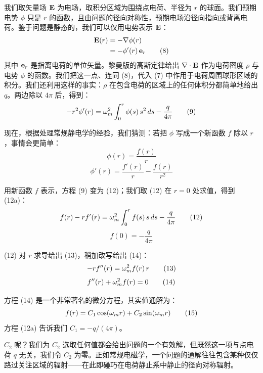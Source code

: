 我们取矢量场 $\mathbf{E}$ 为电场，取积分区域为围绕点电荷、半径为 $r$ 的球面。我们预期电势 $\phi$ 只是 $r$ 的函数，且由问题的径向对称性，预期电场沿径向指向或背离电荷。鉴于问题是静态的，我们可以仅用电势表示 $\mathbf{E}$：
\begin{align}
\mathbf{E}(r) &= -\nabla\phi(r) \nonumber\\
&= -\phi'(r)\,\mathbf{e}_{r} \tag{8}
\end{align}
其中 $\mathbf{e}_{r}$ 是指离电荷的单位矢量。黎曼版的高斯定律给出 $\nabla\cdot\mathbf{E}$ 作为电荷密度 $\rho$ 与电势 $\phi$ 的函数。我们把这一点、连同 (8)，代入 (7) 中作用于电荷周围球形区域的积分。我们还利用这样的事实：$\rho$ 在包含电荷的区域上的任何体积分都简单地给出 $q$。两边除以 $4\pi$ 后，得到：
\begin{equation}
-r^{2}\phi'(r) = \omega_m^{2}\int_{0}^{r}\phi(s)\,s^{2}\,ds - \frac{q}{4\pi} \tag{9}
\end{equation}

现在，根据处理常规静电学的经验，我们猜测：若把 $\phi$ 写成一个新函数 $f$ 除以 $r$，事情会更简单：
\begin{equation}
\phi(r) = \frac{f(r)}{r} \tag{10}
\end{equation}
\begin{equation}
\phi'(r) = \frac{f'(r)}{r} - \frac{f(r)}{r^{2}} \tag{11}
\end{equation}

用新函数 $f$ 表示，方程 (9) 变为 (12)；我们取 (12) 在 $r=0$ 处求值，得到 (12a)：
\begin{equation}
f(r) - r f'(r) = \omega_m^{2}\int_{0}^{r} f(s)\,s\,ds - \frac{q}{4\pi} \tag{12}
\end{equation}
\begin{equation}
f(0) = -\frac{q}{4\pi} \tag{12a}
\end{equation}

(12) 对 $r$ 求导给出 (13)，稍加改写给出 (14)：
\begin{equation}
-r f''(r) = \omega_m^{2} f(r)\,r \tag{13}
\end{equation}
\begin{equation}
f''(r) + \omega_m^{2} f(r) = 0 \tag{14}
\end{equation}

方程 (14) 是一个非常著名的微分方程，其实值通解为：
\begin{equation}
f(r) = C_{1}\cos(\omega_m r) + C_{2}\sin(\omega_m r) \tag{15}
\end{equation}
方程 (12a) 告诉我们 $C_{1} = -q/(4\pi)$。

$C_{2}$ 呢？我们为 $C_{2}$ 选取任何值都会给出问题的一个有效解，但既然这一项与点电荷 $q$ 无关，我们令 $C_{2}$ 为零。正如常规电磁学，一个问题的通解往往包含某种仅仅路过关注区域的辐射——在此即碰巧在电荷静止系中静止的径向对称辐射。

